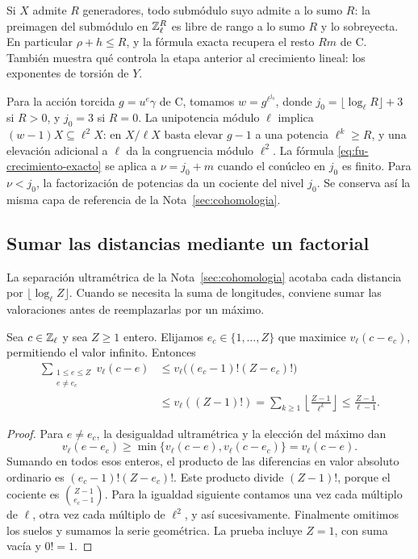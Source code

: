 Si $X$ admite $R$ generadores, todo submódulo suyo admite
a lo sumo $R$: la preimagen del submódulo en $\mathbb{Z}_\ell^R$
es libre de rango a lo sumo $R$ y lo sobreyecta.
En particular $\rho+h\le R$, y la fórmula exacta recupera
el resto $Rm$ de C. También muestra qué controla la etapa
anterior al crecimiento lineal: los exponentes de torsión de $Y$.

Para la acción torcida $g=u^e\gamma$ de C, tomamos
$w=g^{\ell^{j_0}}$, donde
$j_0=\lfloor\log_\ell R\rfloor+3$ si $R>0$, y $j_0=3$
si $R=0$. La unipotencia módulo $\ell$ implica
$(w-1)X\subseteq\ell^2X$: en $X/\ell X$ basta elevar
$g-1$ a una potencia $\ell^k\ge R$, y una elevación adicional
a $\ell$ da la congruencia módulo $\ell^2$.
La fórmula \eqref{eq:fu-crecimiento-exacto} se aplica a
$\nu=j_0+m$ cuando el conúcleo en $j_0$ es finito.
Para $\nu<j_0$, la factorización de potencias da un cociente
del nivel $j_0$. Se conserva así la misma capa de referencia
de la Nota~\ref{sec:cohomologia}.

\subsection{Sumar las distancias mediante un factorial}

La separación ultramétrica de la Nota~\ref{sec:cohomologia}
acotaba cada distancia por $\lfloor\log_\ell Z\rfloor$.
Cuando se necesita la suma de longitudes, conviene sumar
las valoraciones antes de reemplazarlas por un máximo.

\begin{lema}
\label{lem:fu-factorial}
Sea $c\in\mathbb{Z}_\ell$ y sea $Z\ge1$ entero.
Elijamos $e_c\in\{1,\ldots,Z\}$ que maximice $v_\ell(c-e_c)$,
permitiendo el valor infinito. Entonces
\begin{equation}
 \begin{split}
 \sum_{\substack{1\le e\le Z\\e\ne e_c}}v_\ell(c-e)
 &\le v_\ell\bigl((e_c-1)!(Z-e_c)!\bigr)\\
 &\le v_\ell((Z-1)!)
 =\sum_{k\ge1}\left\lfloor\frac{Z-1}{\ell^k}\right\rfloor
 \le\frac{Z-1}{\ell-1}.
 \end{split}
 \label{eq:fu-factorial}
\end{equation}
\end{lema}

\begin{proof}
Para $e\ne e_c$, la desigualdad ultramétrica y la elección
del máximo dan
\[
 v_\ell(e-e_c)\ge
 \min\{v_\ell(c-e),v_\ell(c-e_c)\}=v_\ell(c-e).
\]
Sumando en todos esos enteros, el producto de las diferencias
en valor absoluto ordinario es $(e_c-1)!(Z-e_c)!$.
Este producto divide $(Z-1)!$, porque el cociente es
$\binom{Z-1}{e_c-1}$.
Para la igualdad siguiente contamos una vez cada múltiplo
de $\ell$, otra vez cada múltiplo de $\ell^2$, y así sucesivamente.
Finalmente omitimos los suelos y sumamos la serie geométrica.
La prueba incluye $Z=1$, con suma vacía y $0!=1$.
\end{proof}

